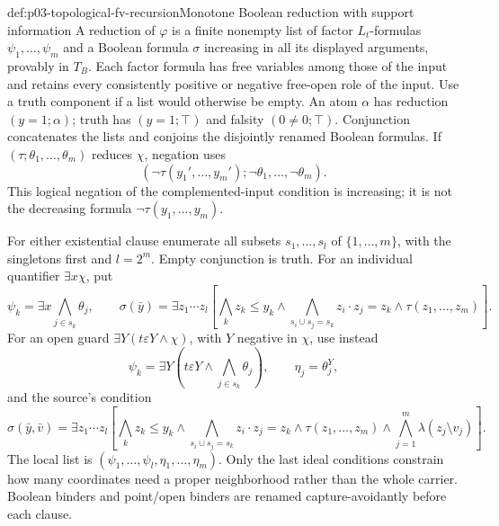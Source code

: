 \begin{hbdefinition}{def:p03-topological-fv-recursion}{Monotone Boolean reduction with support information}
A reduction of \(\varphi\) is a finite nonempty list of factor
\(L_t\)-formulas \(\psi_1,\ldots,\psi_m\) and a Boolean formula
\(\sigma\) increasing in all its displayed arguments, provably in
\(T_B\). Each factor formula has free variables among those of the
input and retains every consistently positive or negative free-open role
of the input. Use a truth component if a list would otherwise be empty.
An atom \(\alpha\) has reduction \((y=1;\alpha)\);
truth has \((y=1;\top)\) and falsity \((0\ne0;\top)\).
Conjunction concatenates the lists and conjoins the disjointly renamed
Boolean formulas. If \((\tau;\theta_1,\ldots,\theta_m)\) reduces
\(\chi\), negation uses
\[
                 (\neg\tau(y_1',\ldots,y_m');
                                   \neg\theta_1,\ldots,\neg\theta_m).
\]
This logical negation of the complemented-input condition is increasing;
it is not the decreasing formula \(\neg\tau(y_1,\ldots,y_m)\).

For either existential clause enumerate all subsets
\(s_1,\ldots,s_l\) of \(\{1,\ldots,m\}\), with the singletons
first and \(l=2^m\). Empty conjunction is truth. For an individual
quantifier \(\exists x\chi\), put
\[
 \psi_k=\exists x\bigwedge_{j\in s_k}\theta_j,\qquad
 \sigma(\bar y)=\exists z_1\cdots z_l
   \left[\bigwedge_k z_k\le y_k\land
    \bigwedge_{s_i\cup s_j=s_k}z_i\cdot z_j=z_k
                       \land\tau(z_1,\ldots,z_m)\right].
\]
For an open guard \(\exists Y(t\varepsilon Y\land\chi)\), with
\(Y\) negative in \(\chi\), use instead
\[
 \psi_k=\exists Y\left(t\varepsilon Y\land
                               \bigwedge_{j\in s_k}\theta_j\right),
 \qquad \eta_j=\theta_j^Y,
\]
and the source's condition
\[
 \sigma(\bar y,\bar v)=\exists z_1\cdots z_l
 \left[\bigwedge_k z_k\le y_k\land
   \bigwedge_{s_i\cup s_j=s_k}z_i\cdot z_j=z_k
   \land\tau(z_1,\ldots,z_m)
   \land\bigwedge_{j=1}^m\lambda(z_j\setminus v_j)\right].
\]
The local list is \((\psi_1,\ldots,\psi_l,\eta_1,\ldots,\eta_m)\).
Only the last ideal conditions constrain how many coordinates need a
proper neighborhood rather than the whole carrier. Boolean binders and
point/open binders are renamed capture-avoidantly before each clause.
\end{hbdefinition}

